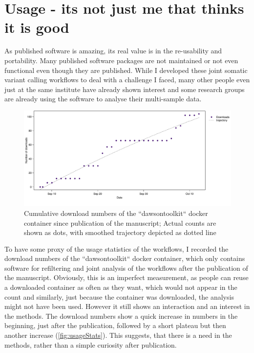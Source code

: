 \section[Usage]{Usage - its not just me that thinks it is good}
As published software is amazing, its real value is in the re-usability and portability. Many published software packages are not maintained or not even functional even though they are published. While I developed these joint somatic variant calling workflows to deal with a challenge I faced, many other people even just at the same institute have already shown interest and some research groups are already using the software to analyse their multi-sample data.

\begin{figure}[!ht]
\centering
\includegraphics[width=.99\linewidth]{Figures/dawsontoolkitDownloads.pdf}
\caption[Usage statistics joint workflows]{Cumulative download numbers of the ``dawsontoolkit`` docker container since publication of the manuscript; Actual counts are shown as dots, with smoothed trajectory depicted as dotted line}\label{fig:usageStats}
\end{figure}

To have some proxy of the usage statistics of the workflows, I recorded the download numbers of the ``dawsontoolkit`` docker container, which only contains software for refiltering and joint analysis of the workflows after the publication of the manuscript. Obviously, this is an imperfect measurement, as people can reuse a downloaded container as often as they want, which would not appear in the count and similarly, just because the container was downloaded, the analysis might not have been used. However it still shows  an interaction and an interest in the methods. The download numbers show a quick increase in numbers in the beginning, just after the publication, followed by a short plateau  but then another increase (\autoref{fig:usageStats}). This suggests, that there is a need in the methods, rather than a simple curiosity after publication. 

